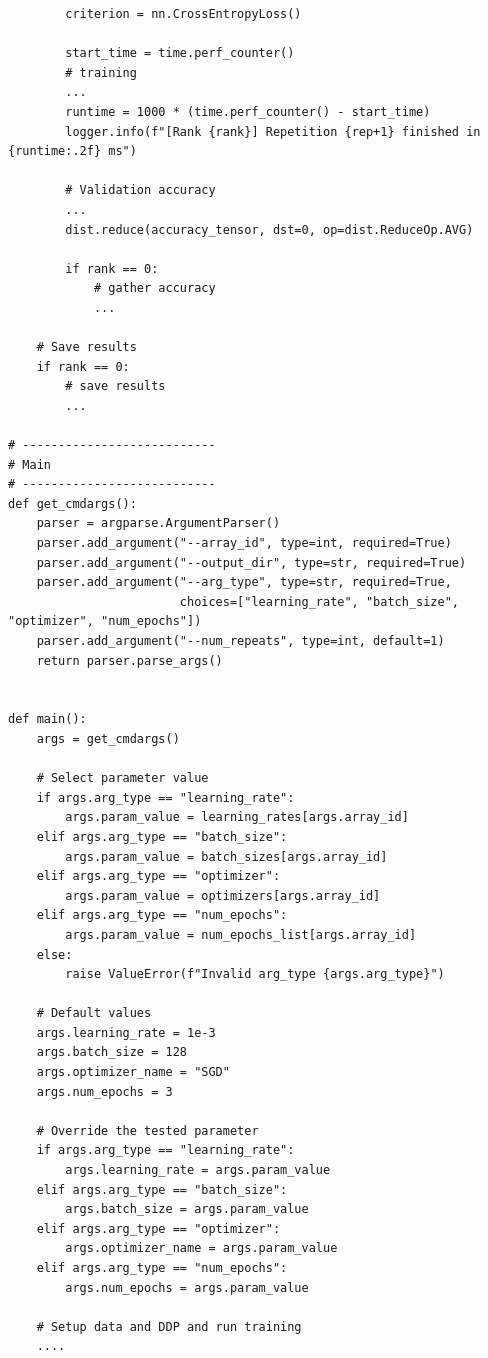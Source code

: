 \documentclass{article}
\begin{document}
\begin{lstlisting}
        criterion = nn.CrossEntropyLoss()

        start_time = time.perf_counter()
        # training
        ...
        runtime = 1000 * (time.perf_counter() - start_time)
        logger.info(f"[Rank {rank}] Repetition {rep+1} finished in {runtime:.2f} ms")

        # Validation accuracy
        ...
        dist.reduce(accuracy_tensor, dst=0, op=dist.ReduceOp.AVG)

        if rank == 0:
            # gather accuracy 
            ...

    # Save results
    if rank == 0:
        # save results
        ...

# ---------------------------
# Main
# ---------------------------
def get_cmdargs():
    parser = argparse.ArgumentParser()
    parser.add_argument("--array_id", type=int, required=True)
    parser.add_argument("--output_dir", type=str, required=True)
    parser.add_argument("--arg_type", type=str, required=True,
                        choices=["learning_rate", "batch_size", "optimizer", "num_epochs"])
    parser.add_argument("--num_repeats", type=int, default=1)
    return parser.parse_args()


def main():
    args = get_cmdargs()

    # Select parameter value
    if args.arg_type == "learning_rate":
        args.param_value = learning_rates[args.array_id]
    elif args.arg_type == "batch_size":
        args.param_value = batch_sizes[args.array_id]
    elif args.arg_type == "optimizer":
        args.param_value = optimizers[args.array_id]
    elif args.arg_type == "num_epochs":
        args.param_value = num_epochs_list[args.array_id]
    else:
        raise ValueError(f"Invalid arg_type {args.arg_type}")

    # Default values
    args.learning_rate = 1e-3
    args.batch_size = 128
    args.optimizer_name = "SGD"
    args.num_epochs = 3

    # Override the tested parameter
    if args.arg_type == "learning_rate":
        args.learning_rate = args.param_value
    elif args.arg_type == "batch_size":
        args.batch_size = args.param_value
    elif args.arg_type == "optimizer":
        args.optimizer_name = args.param_value
    elif args.arg_type == "num_epochs":
        args.num_epochs = args.param_value

    # Setup data and DDP and run training
    ....
\end{lstlisting}
\end{document}
